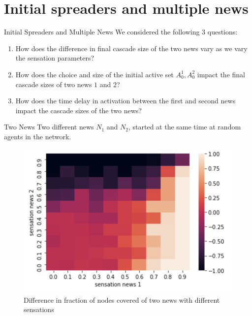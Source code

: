 \documentclass{beamer}
\begin{document}
\section{Initial spreaders and multiple news}

\begin{frame}{Initial Spreaders and Multiple News}
    We considered the following 3 questions:
    \begin{enumerate}
        \item How does the difference in final cascade size of the two news vary as we vary the sensation parameters?
        \item How does the choice and size of the initial active set $A_0^1, A_0^2$ impact the final cascade sizes of two news $1$ and $2$?
        \item How does the time delay in activation between the first and second news impact the cascade sizes of the two news?
    \end{enumerate}
\end{frame}

\begin{frame}{Two News}
    Two different news $N_1$ and $N_2$, started at the same time at random agents in the network.
    \begin{figure}
        \centering
        \includegraphics[width=.5\linewidth]{images/sens_vs_sens.png}
        \caption{Difference in fraction of nodes covered of two news with different sensations}
        \label{fig:sens_vs_sens}
    \end{figure}
\end{frame}
\end{document}
